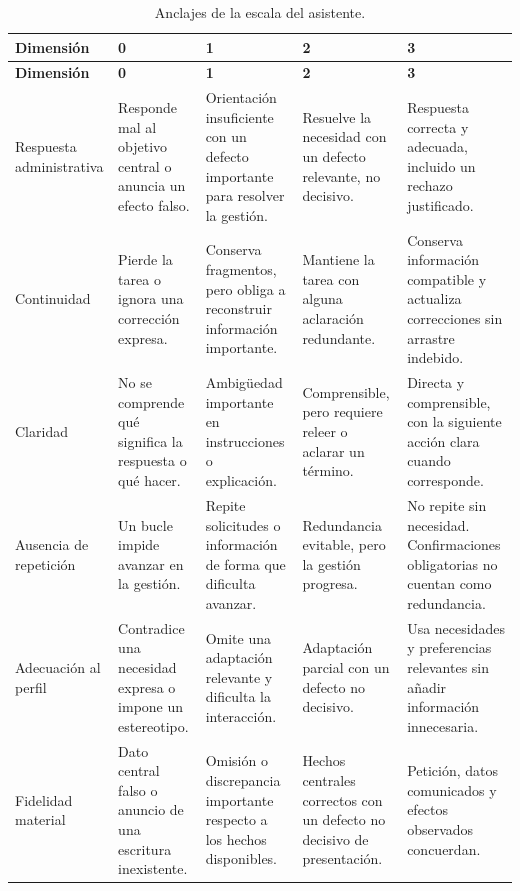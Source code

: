 \begingroup
\setlength{\tabcolsep}{4pt}
\small
\begin{longtable}{L{0.15\textwidth}L{0.18\textwidth}L{0.18\textwidth}L{0.18\textwidth}L{0.18\textwidth}}
\caption{Anclajes de la escala del asistente.}\label{tab:anclajes-asistente}\\
\toprule
\textbf{Dimensión} & \textbf{0} & \textbf{1} & \textbf{2} & \textbf{3} \\
\midrule
\endfirsthead
\toprule
\textbf{Dimensión} & \textbf{0} & \textbf{1} & \textbf{2} & \textbf{3} \\
\midrule
\endhead
Respuesta administrativa & Responde mal al objetivo central o anuncia un efecto falso. & Orientación insuficiente con un defecto importante para resolver la gestión. & Resuelve la necesidad con un defecto relevante, no decisivo. & Respuesta correcta y adecuada, incluido un rechazo justificado. \\
Continuidad & Pierde la tarea o ignora una corrección expresa. & Conserva fragmentos, pero obliga a reconstruir información importante. & Mantiene la tarea con alguna aclaración redundante. & Conserva información compatible y actualiza correcciones sin arrastre indebido. \\
Claridad & No se comprende qué significa la respuesta o qué hacer. & Ambigüedad importante en instrucciones o explicación. & Comprensible, pero requiere releer o aclarar un término. & Directa y comprensible, con la siguiente acción clara cuando corresponde. \\
Ausencia de repetición & Un bucle impide avanzar en la gestión. & Repite solicitudes o información de forma que dificulta avanzar. & Redundancia evitable, pero la gestión progresa. & No repite sin necesidad. Confirmaciones obligatorias no cuentan como redundancia. \\
Adecuación al perfil & Contradice una necesidad expresa o impone un estereotipo. & Omite una adaptación relevante y dificulta la interacción. & Adaptación parcial con un defecto no decisivo. & Usa necesidades y preferencias relevantes sin añadir información innecesaria. \\
Fidelidad material & Dato central falso o anuncio de una escritura inexistente. & Omisión o discrepancia importante respecto a los hechos disponibles. & Hechos centrales correctos con un defecto no decisivo de presentación. & Petición, datos comunicados y efectos observados concuerdan. \\
\bottomrule
\end{longtable}
\endgroup


